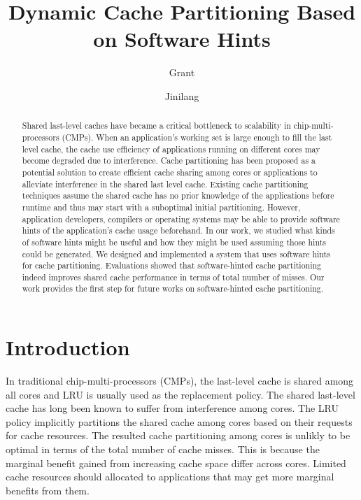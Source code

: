 \documentclass{acm_proc_article-sp}
\title{Dynamic Cache Partitioning Based on Software Hints}
\author{Grant \and Jinilang}
\begin{document}
\maketitle

\begin{abstract}

Shared last-level caches have became a critical bottleneck to scalability in 
chip-multi-processors (CMPs). When an application's working set is large
enough to fill the last level cache, the cache use efficiency of applications running on
different cores may become degraded due to interference. Cache 
partitioning has been proposed as a potential solution to create efficient cache sharing among cores or
applications to alleviate interference in the shared last level cache. Existing cache
partitioning techniques assume the shared cache has no prior knowledge of the 
applications before runtime and thus may start with a suboptimal
initial partitioning. However, application developers, compilers or operating
systems may be able to provide software hints of the application's cache
usage beforehand. In our work, we studied what kinds of software hints might be 
useful and how they might be used assuming those hints could be generated. We
designed and implemented a system that uses software hints for cache 
partitioning. Evaluations showed that software-hinted cache partitioning indeed
improves shared cache performance in terms of total number of misses. Our work
provides the first step for future works on software-hinted cache partitioning.

\end{abstract}

\section{Introduction}

In traditional chip-multi-processors (CMPs), the last-level cache is 
shared among all cores and LRU is usually used as the replacement policy. The shared
last-level cache has long been known to suffer from interference among cores. The 
LRU policy implicitly partitions the shared cache among cores based on their 
requests for cache resources. The resulted cache partitioning among cores is
unlikly to be optimal in terms of the total number of cache misses. This is 
because the marginal benefit gained from increasing cache space differ across 
cores. Limited cache resources should allocated to applications that may get
more marginal benefits from them.
\end{document}
